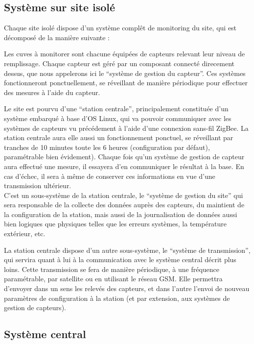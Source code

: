 
\subsection{Système sur site isolé}

Chaque site isolé dispose d'un système complêt de monitoring du site, qui est décomposé de la manière suivante :

Les cuves à monitorer sont chacune équipées de capteurs relevant leur niveau de remplissage. Chaque capteur est géré par un composant connecté direcement dessus, que nous appelerons ici le ``système de gestion du capteur''. Ces systèmes fonctionneront ponctuellement, se réveillant de manière périodique pour effectuer des mesures à l'aide du capteur.

Le site est pourvu d'une ``station centrale'', principalement constituée d'un système embarqué à base d'OS Linux, qui va pouvoir communiquer avec les systèmes de capteurs vu précédement à l'aide d'une connexion sans-fil ZigBee. La station centrale aura elle aussi un fonctionnement ponctuel, se réveillant par tranches de 10 minutes toute les 6 heures (configuration par défaut), paramétrable bien évidement). Chaque fois qu'un système de gestion de capteur aura effectué une mesure, il essayera d'en communiquer le résultat à la base. En cas d'échec, il sera à même de conserver ces informations en vue d'une transmission ultérieur.\\
C'est un sous-système de la station centrale, le ``système de gestion du site'' qui sera responsable de la collecte des données auprès des capteurs, du maintient de la configuration de la station, mais aussi de la journalisation de données aussi bien logiques que physiques telles que les erreurs systèmes, la température extérieur, etc.

La station centrale dispose d'un autre sous-système, le ``système de transmission'', qui servira quant à lui à la communication avec le système central décrit plus loins. Cette transmission se fera de manière périodique, à une fréquence paramétrable, par satellite ou en utilisant le réseau GSM. Elle permettra d'envoyer dans un sens les relevés des capteurs, et dans l'autre l'envoi de nouveau paramètres de configuration à la station (et par extension, aux systèmes de gestion de capteurs).

\subsection{Système central}


